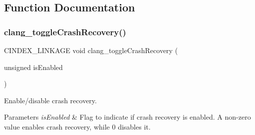 \subsection{Function Documentation}
\mbox{\label{group__CINDEX__MISC_ga45afc52d275aa0587c69d4b6d2f10bf2}} 
\subsubsection{\texorpdfstring{clang\+\_\+toggle\+Crash\+Recovery()}{clang\_toggleCrashRecovery()}}
{\footnotesize\ttfamily C\+I\+N\+D\+E\+X\+\_\+\+L\+I\+N\+K\+A\+GE void clang\+\_\+toggle\+Crash\+Recovery (\begin{DoxyParamCaption}\item[{unsigned}]{is\+Enabled }\end{DoxyParamCaption})}



Enable/disable crash recovery. 


\begin{DoxyParams}{Parameters}
{\em is\+Enabled} & Flag to indicate if crash recovery is enabled. A non-\/zero value enables crash recovery, while 0 disables it. \\
\hline
\end{DoxyParams}
